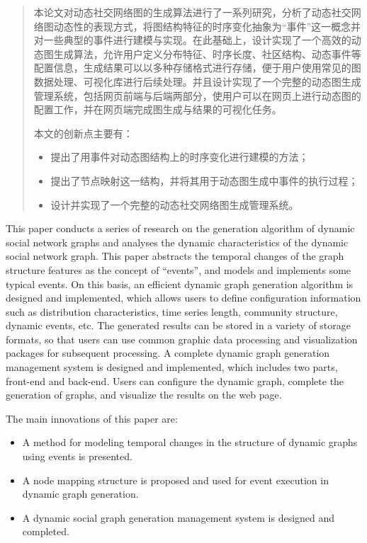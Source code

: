 

\begin{abstract}
  本论文对动态社交网络图的生成算法进行了一系列研究，分析了动态社交网络图动态性的表现方式，将图结构特征的时序变化抽象为“事件”这一概念并对一些典型的事件进行建模与实现。在此基础上，设计实现了一个高效的动态图生成算法，允许用户定义分布特征、时序长度、社区结构、动态事件等配置信息，生成结果可以以多种存储格式进行存储，便于用户使用常见的图数据处理、可视化库进行后续处理。并且设计实现了一个完整的动态图生成管理系统，包括网页前端与后端两部分，使用户可以在网页上进行动态图的配置工作，并在网页端完成图生成与结果的可视化任务。

  本文的创新点主要有：
  \begin{itemize}
    \item 提出了用事件对动态图结构上的时序变化进行建模的方法；
    \item 提出了节点映射这一结构，并将其用于动态图生成中事件的执行过程；
    \item 设计并实现了一个完整的动态社交网络图生成管理系统。
  \end{itemize}

\end{abstract}

\begin{abstract*}
  This paper conducts a series of research on the generation algorithm of dynamic social network graphs and analyses the dynamic characteristics of the dynamic social network graph. This paper abstracts the temporal changes of the graph structure features as the concept of “events”, and models and implements some typical events. On this basis, an efficient dynamic graph generation algorithm is designed and implemented, which allows users to define configuration information such as distribution characteristics, time series length, community structure, dynamic events, etc. The generated results can be stored in a variety of storage formats, so that users can use common graphic data processing and visualization packages for subsequent processing. A complete dynamic graph generation management system is designed and implemented, which includes two parts, front-end and back-end. Users can configure the dynamic graph, complete the generation of graphs, and visualize the results on the web page.

  The main innovations of this paper are:
  \begin{itemize}
    \item A method for modeling temporal changes in the structure of dynamic graphs using events is presented.
    \item A node mapping structure is proposed and used for event execution in dynamic graph generation.
    \item A dynamic social graph generation management system is designed and completed.
  \end{itemize}

\end{abstract*}

